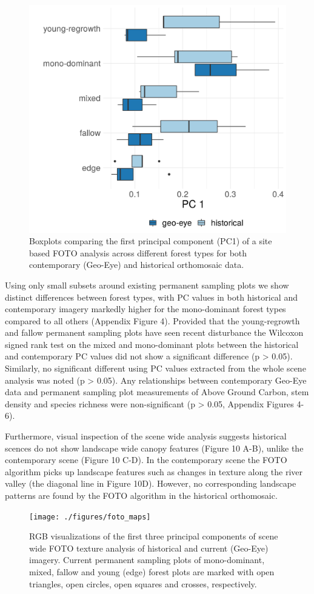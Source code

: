 \documentclass[remote sensing,article,submit,moreauthors,pdftex]{mdpi}
\begin{document}
\begin{figure}

{\centering \includegraphics[width=0.5\linewidth]{./figures/foto_bplot_psp} 

}

\caption{Boxplots comparing the first principal component (PC1) of a site based FOTO analysis across different forest types for both contemporary (Geo-Eye) and historical orthomosaic data.}\label{fig:unnamed-chunk-13}
\end{figure}

Using only small subsets around existing permanent sampling plots we
show distinct differences between forest types, with PC values in both
historical and contemporary imagery markedly higher for the
mono-dominant forest types compared to all others (Appendix Figure 4).
Provided that the young-regrowth and fallow permanent sampling plots
have seen recent disturbance the Wilcoxon signed rank test on the mixed
and mono-dominant plots between the historical and contemporary PC
values did not show a significant difference (p \textgreater{} 0.05).
Similarly, no significant different using PC values extracted from the
whole scene analysis was noted (p \textgreater{} 0.05). Any
relationships between contemporary Geo-Eye data and permanent sampling
plot measurements of Above Ground Carbon, stem density and species
richness were non-significant (p \textgreater{} 0.05, Appendix Figures
4-6).

Furthermore, visual inspection of the scene wide analysis suggests
historical scences do not show landscape wide canopy features (Figure 10
A-B), unlike the contemporary scene (Figure 10 C-D). In the contemporary
scene the FOTO algorithm picks up landscape features such as changes in
texture along the river valley (the diagonal line in Figure 10D).
However, no corresponding landscape patterns are found by the FOTO
algorithm in the historical orthomosaic.

\begin{figure}

{\centering \texttt{[image: ./figures/foto\_maps]} 

}

\caption{RGB visualizations of the first three principal components of scene wide FOTO texture analysis of historical and current (Geo-Eye) imagery. Current permanent sampling plots of mono-dominant, mixed, fallow and young (edge) forest plots are marked with open triangles, open circles, open squares and crosses, respectively.}\label{fig:unnamed-chunk-14}
\end{figure}
\end{document}
